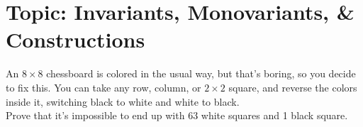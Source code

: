 

\DeclareRobustCommand{\stirling}{\genfrac\{\}{0pt}{}}
\setcounter{secnumdepth}{0} 

\newcommand{\weekNum}{9} %
\newcommand{\meetingDate}{Mar 19, 2025} 

\usepackage{pgfplots}
\pgfplotsset{compat=1.17}


\pagestyle{empty}
\sloppy
\maketitle

\section{Topic: Invariants, Monovariants, \& Constructions}

\begin{problem}
    An $8\times8$ chessboard is colored in the usual way, but that’s boring, so you decide to fix this. You can take any row, column, or $2\times2$ square, and reverse the colors inside it, switching black to white and white to black.\\[\parskip]
    
    Prove that it’s impossible to end up with 63 white squares and 1 black square.
\end{problem}

